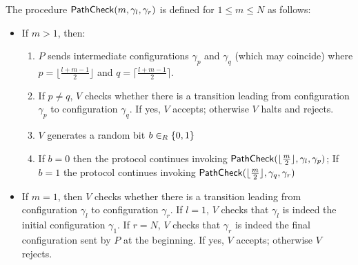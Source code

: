 \medskip
\noindent The procedure $\mathsf{PathCheck}(m,\gamma_l, \gamma_r)$ is defined for $1 \leq m \leq N$ as 
follows:
\begin{framed}
\begin{itemize}
    \item If $m > 1$, then:
    \begin{enumerate}
        \item $P$ sends intermediate configurations $\gamma_{p}$ and $\gamma_q$ (which may coincide) where $p = \lfloor \frac{l+m-1}{2} \rfloor$  and 
        $q = \lceil \frac{l+m-1}{2} \rceil$. %
        \item If $p \neq q$, $V$ checks whether there is a transition leading from configuration $\gamma_p$ to configuration $\gamma_q$. If yes, $V$ accepts; otherwise $V$ halts and rejects.
	\item $V$ generates a random bit $b \in_R \{0, 1\}$
        \item If  $b = 0$ then the protocol continues invoking $\mathsf{PathCheck}(\lfloor \frac{m}{2} \rfloor, \gamma_l, \gamma_p)$; If $b = 1$ the protocol continues invoking $\mathsf{PathCheck}(\lfloor \frac{m}{2} \rfloor, \gamma_q, \gamma_r)$
    \end{enumerate}
    \item If $m = 1$, then $V$ checks whether there is a transition leading from configuration $\gamma_l$ to configuration $\gamma_r$. If $l=1$, $V$ checks that $\gamma_l$ is indeed the initial configuration $\gamma_1$. If $r=N$, $V$ checks that $\gamma_r$ is indeed the final configuration sent by $P$ at the beginning. If yes, $V$ accepts; otherwise $V$ rejects.
\end{itemize}
\end{framed}

\medskip

